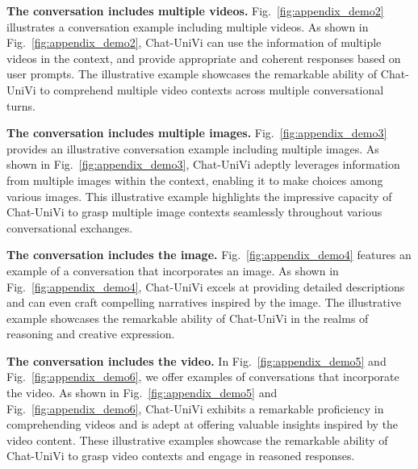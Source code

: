 \documentclass[10pt,twocolumn,letterpaper]{article}
\newcommand{\myparagraph}[1]{\textbf{#1}\hspace{1.8ex}}
\begin{document}
\noindent \myparagraph{The conversation includes multiple videos.} 
Fig.~\ref{fig:appendix_demo2} illustrates a conversation example including multiple videos. As shown in Fig.~\ref{fig:appendix_demo2}, Chat-UniVi can use the information of multiple videos in the context, and provide appropriate and coherent responses based on user prompts. The illustrative example showcases the remarkable ability of Chat-UniVi to comprehend multiple video contexts across multiple conversational turns.

\noindent \myparagraph{The conversation includes multiple images.} 
Fig.~\ref{fig:appendix_demo3} provides an illustrative conversation example including multiple images. As shown in Fig.~\ref{fig:appendix_demo3}, Chat-UniVi adeptly leverages information from multiple images within the context, enabling it to make choices among various images. This illustrative example highlights the impressive capacity of Chat-UniVi to grasp multiple image contexts seamlessly throughout various conversational exchanges.

\noindent \myparagraph{The conversation includes the image.} 
Fig.~\ref{fig:appendix_demo4} features an example of a conversation that incorporates an image. As shown in Fig.~\ref{fig:appendix_demo4}, Chat-UniVi excels at providing detailed descriptions and can even craft compelling narratives inspired by the image. The illustrative example showcases the remarkable ability of Chat-UniVi in the realms of reasoning and creative expression.

\noindent \myparagraph{The conversation includes the video.} 
In Fig.~\ref{fig:appendix_demo5} and Fig.~\ref{fig:appendix_demo6}, we offer examples of conversations that incorporate the video. As shown in Fig.~\ref{fig:appendix_demo5} and Fig.~\ref{fig:appendix_demo6}, Chat-UniVi exhibits a remarkable proficiency in comprehending videos and is adept at offering valuable insights inspired by the video content. These illustrative examples showcase the remarkable ability of Chat-UniVi to grasp video contexts and engage in reasoned responses.
\end{document}

